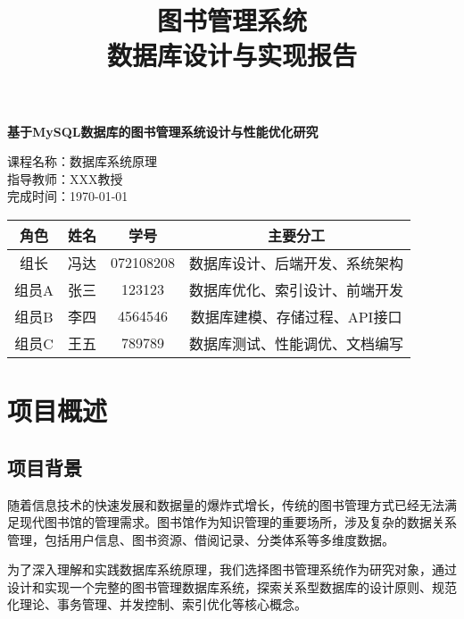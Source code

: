\documentclass[12pt,a4paper]{article}
\title{\textbf{\Huge 图书管理系统\\数据库设计与实现报告}}
\author{}
\date{}
\begin{document}
\maketitle
\thispagestyle{empty}

\vspace{2cm}

\begin{center}
\Large
\textbf{基于MySQL数据库的图书管理系统设计与性能优化研究}

\vspace{1cm}

\normalsize
课程名称：数据库系统原理\\
指导教师：XXX教授\\
完成时间：\today

\vspace{3cm}

\begin{table}[H]
\centering
\begin{tabular}{|c|c|c|c|}
\hline
\textbf{角色} & \textbf{姓名} & \textbf{学号} & \textbf{主要分工} \\
\hline
组长 & 冯达 & 072108208 & 数据库设计、后端开发、系统架构 \\
\hline
组员A & 张三 & 123123 & 数据库优化、索引设计、前端开发 \\
\hline
组员B & 李四 & 4564546 & 数据库建模、存储过程、API接口 \\
\hline
组员C & 王五 & 789789 & 数据库测试、性能调优、文档编写 \\
\hline
\end{tabular}
\end{table}

\end{center}

\newpage
\tableofcontents
\newpage

\section{项目概述}

\subsection{项目背景}
随着信息技术的快速发展和数据量的爆炸式增长，传统的图书管理方式已经无法满足现代图书馆的管理需求。图书馆作为知识管理的重要场所，涉及复杂的数据关系管理，包括用户信息、图书资源、借阅记录、分类体系等多维度数据。

为了深入理解和实践数据库系统原理，我们选择图书管理系统作为研究对象，通过设计和实现一个完整的图书管理数据库系统，探索关系型数据库的设计原则、规范化理论、事务管理、并发控制、索引优化等核心概念。
\end{document}
